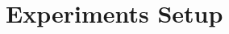 \documentclass[../../main.tex]{subfiles}
\begin{document}
\footnotesize
\section{Experiments Setup}

\lipsum[2-4]
\end{document}

